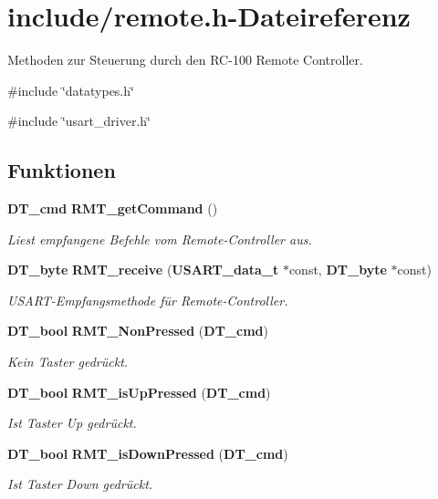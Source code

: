 \section{include/remote.h-\/Dateireferenz}
\label{remote_8h}


Methoden zur Steuerung durch den RC-\/100 Remote Controller.  


{\ttfamily \#include \char`\"{}datatypes.h\char`\"{}}\par
{\ttfamily \#include \char`\"{}usart\_\-driver.h\char`\"{}}\par
\subsection*{Funktionen}
\begin{DoxyCompactItemize}
\item 
{\bf DT\_\-cmd} {\bf RMT\_\-getCommand} ()
\begin{DoxyCompactList}\small\item\em Liest empfangene Befehle vom Remote-\/Controller aus. \item\end{DoxyCompactList}\item 
{\bf DT\_\-byte} {\bf RMT\_\-receive} ({\bf USART\_\-data\_\-t} $\ast$const, {\bf DT\_\-byte} $\ast$const)
\begin{DoxyCompactList}\small\item\em USART-\/Empfangsmethode für Remote-\/Controller. \item\end{DoxyCompactList}\item 
{\bf DT\_\-bool} {\bf RMT\_\-NonPressed} ({\bf DT\_\-cmd})
\begin{DoxyCompactList}\small\item\em Kein Taster gedrückt. \item\end{DoxyCompactList}\item 
{\bf DT\_\-bool} {\bf RMT\_\-isUpPressed} ({\bf DT\_\-cmd})
\begin{DoxyCompactList}\small\item\em Ist Taster Up gedrückt. \item\end{DoxyCompactList}\item 
{\bf DT\_\-bool} {\bf RMT\_\-isDownPressed} ({\bf DT\_\-cmd})
\begin{DoxyCompactList}\small\item\em Ist Taster Down gedrückt. \item\end{DoxyCompactList}\item 

\end{DoxyCompactItemize}
